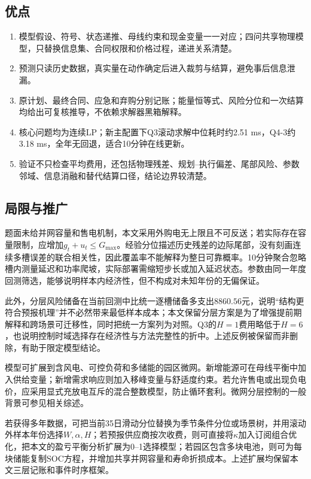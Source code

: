 \documentclass[UTF8,12pt,a4paper]{ctexart}
\theoremstyle{remark}
\begin{document}
\subsection{优点}
\begin{enumerate}
\item 模型假设、符号、状态递推、母线约束和现金变量一一对应；四问共享物理模型，只替换信息集、合同权限和价格过程，递进关系清楚。
\item 预测只读历史数据，真实量在动作确定后进入裁剪与结算，避免事后信息泄漏。
\item 原计划、最终合同、应急和弃购分别记账；能量恒等式、风险分位和一次结算均给出可复核推导，不依赖求解器黑箱解释。
\item 核心问题均为连续LP；新主配置下Q3滚动求解中位耗时约2.51 ms，Q4-3约3.18 ms，全年无回退，适合10分钟在线更新。
\item 验证不只检查平均费用，还包括物理残差、规划--执行偏差、尾部风险、参数邻域、信息消融和替代结算口径，结论边界较清楚。
\end{enumerate}
\subsection{局限与推广}
题面未给并网容量和售电机制，本文采用外购电无上限且不可反送；若实际存在容量限制，应增加$g_t+u_t\le G_{\max}$。经验分位描述历史残差的边际尾部，没有刻画连续多槽误差的联合相关性，因此覆盖率不能解释为整日可靠概率。10分钟聚合忽略槽内测量延迟和功率爬坡，实际部署需缩短步长或加入延迟状态。参数由同一年度回测筛选，能够说明样本内经济性，但不构成对未知年份的无偏保证。

此外，分层风险储备在当前回测中比统一逐槽储备多支出$8860.56$元，说明“结构更符合预报机理”并不必然带来最低样本成本；本文保留分层方案是为了增强提前期解释和跨场景可迁移性，同时把统一方案列为对照。Q3的$H=1$费用略低于$H=6$，也说明控制时域选择存在经济性与方法完整性的折中。上述反例被保留而非删除，有助于限定模型结论。

模型可扩展到含风电、可控负荷和多储能的园区微网。新增能源可在母线平衡中加入供给变量；新增需求响应则加入移峰变量与舒适度约束。若允许售电或出现负电价，应采用显式充放电互斥的混合整数模型，防止循环套利。微网分层控制的一般背景可参见相关综述\cite{bouzid2015microgrid}。

若获得多年数据，可把当前35日滑动分位替换为季节条件分位或场景树，并用滚动外样本年份选择$W,\alpha,H$；若预报供应商按次收费，则可直接将$\kappa$加入订阅组合优化，把本文的盈亏平衡分析扩展为0--1选择模型；若园区包含多块电池，则可为每块储能复制SOC方程，并增加共享并网容量和寿命折损成本。上述扩展均保留本文三层记账和事件时序框架。
\end{document}
